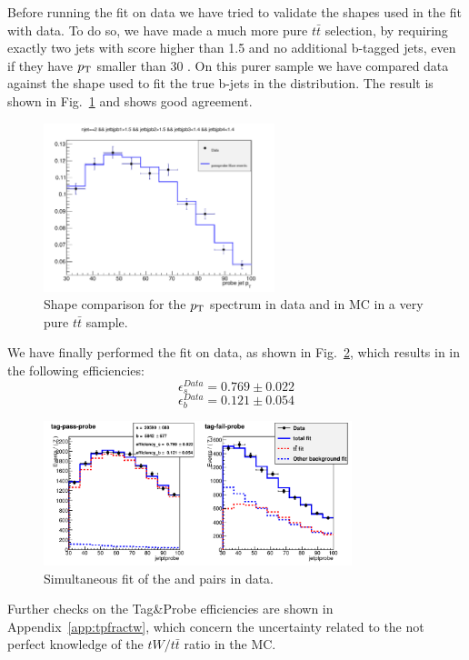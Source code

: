 Before running the fit on data we have tried to validate the shapes used in the fit with data. To do so, we have made a much more pure $t\bar{t}$ selection, by requiring exactly two jets with \jpb score higher than 1.5 and no additional b-tagged jets, even if they have $p_\mathrm{T}$ smaller than 30 \GeV. On this purer sample we have compared data against the shape used to fit the true b-jets in the \tpp{} distribution. The result is shown in Fig.~\ref{fig:purett} and shows good agreement.
\begin{figure}[t]
\centering
\includegraphics[width=0.6\textwidth]{images/passprobe_data_mc.pdf}
\caption{Shape comparison for the \probe{} $p_\mathrm{T}$ spectrum in data and in MC in a very pure $t\bar{t}$ sample.\label{fig:purett}}
\end{figure}

We have finally performed the fit on data, as shown in Fig.~\ref{fig:data_tp}, which results in in the following efficiencies:
\begin{equation}
\epsilon_{s}^{Data}=0.769\pm0.022
\end{equation}
\begin{equation}
\epsilon_{b}^{Data}=0.121\pm0.054
\end{equation}

\begin{figure}[b]
\centering
\includegraphics[width=0.8\textwidth]{images/data_ptprobe.pdf}
\caption{Simultaneous fit of the \tpp{} and \tfp{} pairs in data.\label{fig:data_tp}}
\end{figure}
Further checks on the Tag\&Probe efficiencies are shown in Appendix~\ref{app:tpfractw}, which concern the uncertainty related to the not perfect knowledge of the $tW/t\bar{t}$ ratio in the MC.


